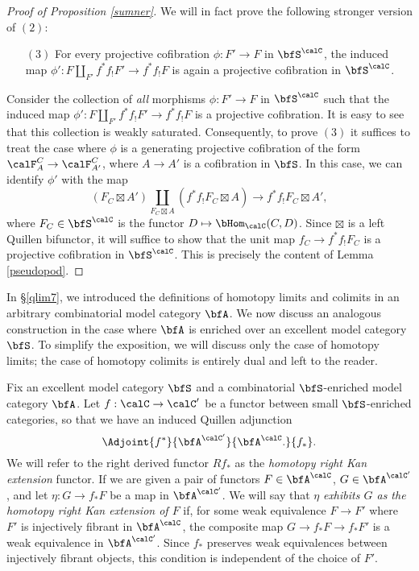 \begin{Simplicial Categories}
\begin{proof}[Proof of Proposition \ref{sumner}]
We will in fact prove the following stronger version of $(2)$:
\begin{itemize}
\item[$(3)$] For every projective cofibration $\phi: F' \rightarrow F$ in $\bfS^{\calC}$, the induced map
$\phi': F \coprod_{F'} f^{\ast} f_{!} F' \rightarrow f^{\ast} f_{!} F$ is again a projective cofibration in 
$\bfS^{\calC}$. 
\end{itemize}
Consider the collection of {\em all} morphisms $\phi: F' \rightarrow F$ in $\bfS^{\calC}$ such that
the induced map $\phi': F \coprod_{F'} f^{\ast} f_{!} F' \rightarrow f^{\ast} f_{!} F$ is
a projective cofibration. It is easy to see that this collection is weakly saturated. Consequently, to prove
$(3)$ it suffices to treat the case where $\phi$ is a generating projective cofibration of the form
$\calF^{C}_{A} \rightarrow \calF^{C}_{A'}$, where $A \rightarrow A'$ is a cofibration in $\bfS$. 
In this case, we can identify $\phi'$ with the map 
$$ (F_C \boxtimes A') \coprod_{ F_C \boxtimes A } (f^{\ast} f_{!} F_C \boxtimes A) \rightarrow f^{\ast} f_{!} F_C \boxtimes A',$$
where $F_C \in \bfS^{\calC}$ is the functor $D \mapsto \bHom_{\calC}(C, D)$. Since
$\boxtimes$ is a left Quillen bifunctor, it will suffice to show that the unit map
$f_C \rightarrow f^{\ast} f_{!} F_C$ is a projective cofibration in $\bfS^{\calC}$. This is precisely the content of Lemma \ref{pseudopod}.
\end{proof}

In \S \ref{qlim7}, we introduced the definitions of homotopy limits and colimits in an arbitrary
combinatorial model category $\bfA$. We now discuss an analogous construction in the case where $\bfA$ is enriched over an excellent model category $\bfS$. To simplify the exposition, we will discuss only the case of homotopy limits; the case of homotopy colimits is entirely dual and left to the reader.

Fix an excellent model category $\bfS$ and a combinatorial $\bfS$-enriched model category $\bfA$. Let $f: \calC \rightarrow \calC'$ be a functor between small $\bfS$-enriched categories,
so that we have an induced Quillen adjunction
$$ \Adjoint{f^{\ast}}{\bfA^{\calC'}}{\bfA^{\calC}.}{f_{\ast}}.$$
We will refer to the right derived functor $Rf_{\ast}$ as the {\it homotopy right Kan extension} functor. If we are given a pair of functors $F \in \bfA^{\calC}$, $G \in \bfA^{\calC'}$, and let $\eta: G \rightarrow f_{\ast} F$ be a map in $\bfA^{\calC'}$. We will say that $\eta$ {\it exhibits $G$ as the homotopy right Kan extension of $F$}
if, for some weak equivalence $F \rightarrow F'$ where $F'$ is injectively fibrant in $\bfA^{\calC}$, the
composite map $G \rightarrow f_{\ast} F \rightarrow f_{\ast} F'$ is a weak equivalence in
$\bfA^{\calC'}$. Since $f_{\ast}$ preserves weak equivalences between injectively fibrant objects, this condition is independent of the choice of $F'$.


\end{Simplicial Categories}
